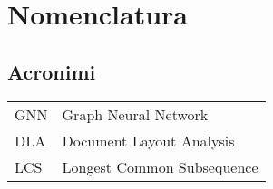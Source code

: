 \chapter*{Nomenclatura}

\section*{Acronimi}
    \begin{supertabular}{l l}
        GNN                      &    Graph Neural Network           	  		                      \\
        DLA                      &    Document Layout Analysis                                        \\
        LCS                      &    Longest Common Subsequence                                      \\
    \end{supertabular}